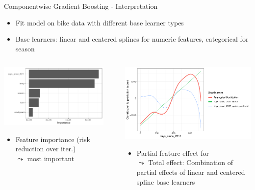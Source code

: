 \documentclass[11pt,compress,t,notes=noshow, aspectratio=169, xcolor=table]{beamer}
\begin{document}
\begin{frame}{Componentwise Gradient Boosting - Interpretation}

\begin{itemize}
    \item Fit model on bike data with different base learner types 
    \item Base learners: linear and centered splines for numeric features, categorical for season
\end{itemize}
\begin{columns}[T]
\pause
\begin{column}{0.5\textwidth}
 \includegraphics[width = 0.9\textwidth]{figure/compboost_pfi.pdf}
 \begin{itemize}
     \item Feature importance (risk reduction over iter.)\\
     $\leadsto$  most important
 \end{itemize}
%
\end{column}
\pause
\begin{column}{0.5\textwidth}  %
  \includegraphics[width = 0.9 \textwidth]{figure/compboost_pfe.pdf}
  \begin{itemize}
      \item Partial feature effect for \\
      $\leadsto$ Total effect: Combination of partial effects of linear and centered spline base learners 
  \end{itemize}
\end{column}
\end{columns}
\end{frame}
\end{document}
